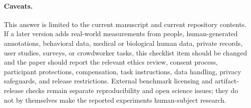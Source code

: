 \paragraph{Caveats.}
This answer is limited to the current manuscript and current repository
contents. If a later version adds real-world measurements from people,
human-generated annotations, behavioral data, medical or biological human data,
private records, user studies, surveys, or crowdworker tasks, this checklist
item should be changed and the paper should report the relevant ethics review,
consent process, participant protections, compensation, task instructions, data
handling, privacy safeguards, and release restrictions. External benchmark
licensing and artifact-release checks remain separate reproducibility and open
science issues; they do not by themselves make the reported experiments
human-subject research.

